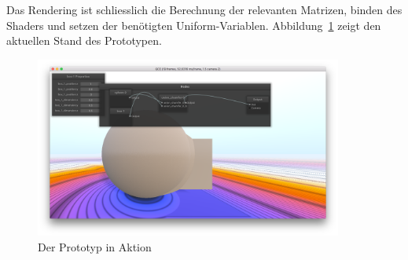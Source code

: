 Das Rendering ist schliesslich die Berechnung der relevanten Matrizen, binden
des Shaders und setzen der benötigten Uniform-Variablen.
Abbildung~\ref{fig:prototype:procedure} zeigt den aktuellen Stand des
Prototypen.

\begin{figure}[H]
    \centering
    \includegraphics[width=0.9\textwidth]{img/prototype.png}
    \caption{Der Prototyp in Aktion
        \protect\footnotemark}\label{fig:prototype:procedure}
\end{figure}
